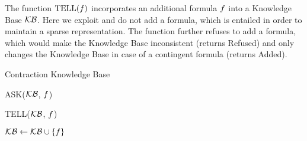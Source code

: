 The function $\mathrm{TELL}(f)$ incorporates an additional formula $f$ into a Knowledge Base $\mathcal{KB}$.
Here we exploit  and do not add a formula, which is entailed in order to maintain a sparse representation. %
The function further refuses to add a formula, which would make the Knowledge Base inconsistent (returns Refused) and only changes the Knowledge Base in case of a contingent formula (returns Added).

\begin{algorithm}[hbt!]
    \caption{Contraction Knowledge Base}\label{alg:contractionKB}
    ASK($\mathcal{KB}$, $f$)
    \begin{algorithmic}
        \State{$\hypercoreat{\formulavar} \algdefsymbol \contractionof{\{\secexformulaat{\shortcatvariables} \, : \, \secexformula\in\kb\},\rencodingofat{\exformula}{\formulavar,\shortcatvariables}}{\formulavar}$}
        \EndIf
        \EndIf
        \EndIf
    \end{algorithmic}
    TELL($\mathcal{KB}$, $f$)
    \begin{algorithmic}
        \EndIf
        \EndIf
        \EndIf
            \State $\mathcal{KB} \leftarrow \mathcal{KB}\cup\{f\}$
        \EndIf
    \end{algorithmic}

\end{algorithm}





